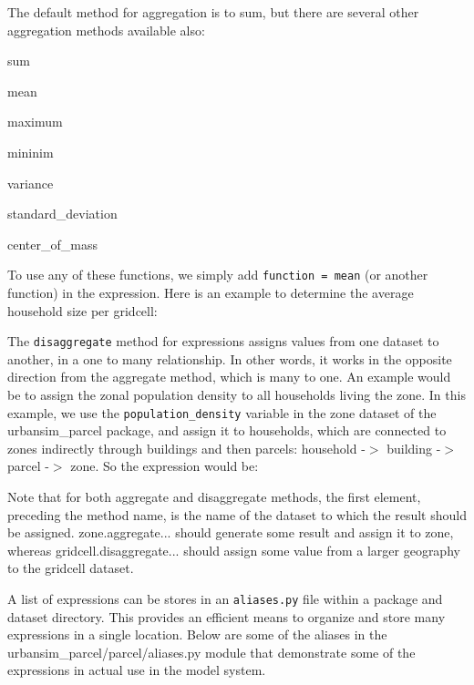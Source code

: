 
The default method for aggregation is to sum, but there are several other aggregation methods available also:

\squishlist
\item sum
\item mean
\item maximum
\item mininim
\item variance
\item standard\_deviation
\item center\_of\_mass
\squishend

To use any of these functions, we simply add \verb#function = mean# (or another function) in the expression.  Here is an example to determine the average household size per gridcell:


The \verb#disaggregate# method for expressions assigns values from one dataset to another, in a one to many relationship.  In other words, it works in the opposite direction from the aggregate method, which is many to one.  An example would be to assign the zonal population density to all households living the zone.  In this example, we use the \verb#population_density# variable in the zone dataset of the urbansim\_parcel package, and assign it to households, which are connected to zones indirectly through buildings and then parcels: household -$>$ building -$>$ parcel -$>$ zone.  So the expression would be:


Note that for both aggregate and disaggregate methods, the first element, preceding the method name, is the name of the dataset to which the result should be assigned.  zone.aggregate... should generate some result and assign it to zone, whereas gridcell.disaggregate... should assign some value from a larger geography to the gridcell dataset.

A list of expressions can be stores in an \verb#aliases.py# file within a package and dataset directory.  This provides an efficient means to organize and store many expressions in a single location.  Below are some of the aliases in the urbansim\_parcel/parcel/aliases.py module that demonstrate some of the expressions in actual use in the model system.\\

